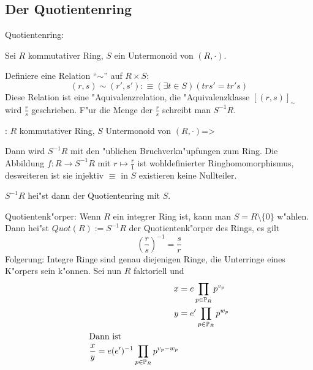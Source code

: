 \subsection{Der Quotientenring}
 Quotientenring:{
  Sei $R$ kommutativer Ring, $S$ ein Untermonoid von $(R,\cdot)$.
  
  Definiere eine Relation ``$\sim$'' auf $R\times S$:
  \[(r,s)\sim (r',s') :\equiv (\exists t\in S)(trs'=tr's)
    \]
  Diese Relation ist eine "Aquivalenzrelation,
  die "Aquivalenzklasse $[(r,s)]_\sim$ wird $\frac r s$ geschrieben. F"ur
  die Menge der $\frac r s$ schreibt man $S^{-1}R$.
  }
\theorem: $R$ kommutativer Ring, $S$ Untermonoid von $(R,\cdot)$=>{
  Dann wird $S^{-1}R$ mit den "ublichen Bruchverkn"upfungen zum Ring.
  Die Abbildung $f:R\to S^{-1}R$ mit $r\mapsto \frac r 1$ ist wohldefinierter 
  Ringhomomorphismus, desweiteren ist sie injektiv $\equiv$ 
  in $S$ existieren keine Nullteiler.
  
  $S^{-1}R$ hei"st dann der Quotientenring mit  $S$.
  }
 Quotientenk"orper:{
  Wenn $R$ ein integrer Ring ist, kann man $S=R\setminus\{0\}$ w"ahlen.
  Dann hei"st $Quot(R):=S^{-1}R$ der Quotientenk"orper des Rings, es gilt
  \[\left(\frac r s \right)^{-1} =\frac s r
    \]
  }
\remark Folgerung:{
  Integre Ringe sind genau diejenigen Ringe, die Unterringe eines
  K"orpers sein k"onnen. Sei nun $R$ faktoriell und 
 \begin{align*}
   x&=e\prod_{p\in\mathbb P_R} p^{v_p} \\
   y&=e'\prod_{p\in\mathbb P_R} p^{w_p} \\
 \intertext{Dann ist}
   \frac x y=e (e')^{-1}\prod_{p\in\mathbb P_R} p^{v_p-w_p}
   \end{align*}
 }
